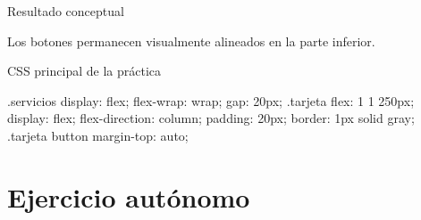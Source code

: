 \documentclass[aspectratio=169,11.5pt]{beamer}
\begin{document}
    \begin{frame}{Resultado conceptual}
        \begin{center}
        \end{center}

        Los botones permanecen visualmente
        alineados en la parte inferior.
    \end{frame}

    \begin{frame}[fragile]{CSS principal de la práctica}
        \begin{csscodedark}
            .servicios {
                display: flex;
                flex-wrap: wrap;
                gap: 20px;
            }
            .tarjeta {
                flex: 1 1 250px;
                display: flex;
                flex-direction: column;
                padding: 20px;
                border: 1px solid gray;
            }
            .tarjeta button {
                margin-top: auto;
            }
        \end{csscodedark}
    \end{frame}



    \section{Ejercicio autónomo}
\end{document}
